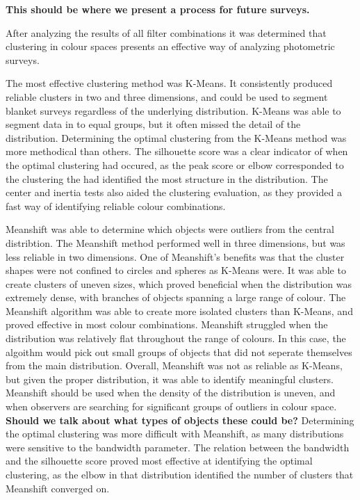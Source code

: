 \textbf{This should be where we present a process for future surveys.}

After analyzing the results of all filter combinations it was determined that clustering in colour spaces presents an effective way of analyzing photometric surveys.

The most effective clustering method was K-Means.
It consistently produced reliable clusters in two and three dimensions, and could be used to segment blanket surveys regardless of the underlying distribution.
K-Means was able to segment data in to equal groups, but it often missed the detail of the distribution.
Determining the optimal clustering from the K-Means method was more methodical than others.
The silhouette score was a clear indicator of when the optimal clustering had occured, as the peak score or elbow corresponded to the clustering the had identified the most structure in the distribution.
The center and inertia tests also aided the clustering evaluation, as they provided a fast way of identifying reliable colour combinations.

Meanshift was able to determine which objects were outliers from the central distribtion.
The Meanshift method performed well in three dimensions, but was less reliable in two dimensions.
One of Meanshift's benefits was that the cluster shapes were not confined to circles and spheres as K-Means were.
It was able to create clusters of uneven sizes, which proved beneficial when the distribution was extremely dense, with branches of objects spanning a large range of colour.
The Meanshift algorithm was able to create more isolated clusters than K-Means, and proved effective in most colour combinations.
Meanshift struggled when the distribution was relatively flat throughout the range of colours.
In this case, the algoithm would pick out small groups of objects that did not seperate themselves from the main distribution.
Overall, Meanshift was not as reliable as K-Means, but given the proper distribution, it was able to identify meaningful clusters.
Meanshift should be used when the density of the distribution is uneven, and when observers are searching for significant groups of outliers in colour space.
\textbf{Should we talk about what types of objects these could be?}
Determining the optimal clustering was more difficult with Meanshift, as many distributions were sensitive to the bandwidth parameter.
The relation between the bandwidth and the silhouette score proved most effective at identifying the optimal clustering, as the elbow in that distribution identified the number of clusters that Meanshift converged on.

